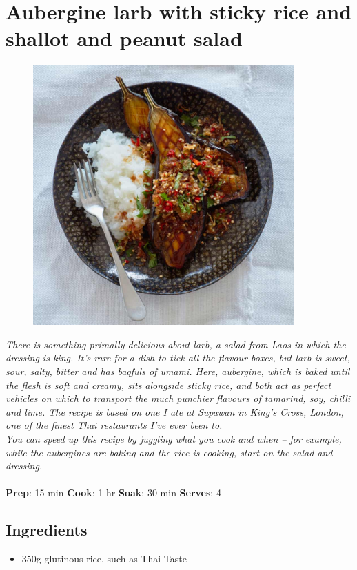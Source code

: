 \documentclass{book}
\begin{document}
\section{Aubergine larb with sticky rice and shallot and peanut salad}
\begin{figure}
\centering\includegraphics[width=10cm,height=10cm,keepaspectratio]{Recipe_Pictures/Aubergine_larb_with_sticky_rice_and_shallot_and_peanut_salad.png}
\end{figure}
\emph{There is something primally delicious about larb, a salad from Laos in which the dressing is king. It’s rare for a dish to tick all the flavour boxes, but larb is sweet, sour, salty, bitter and has bagfuls of umami. Here, aubergine, which is baked until the flesh is soft and creamy, sits alongside sticky rice, and both act as perfect vehicles on which to transport the much punchier flavours of tamarind, soy, chilli and lime. The recipe is based on one I ate at Supawan in King’s Cross, London, one of the finest Thai restaurants I’ve ever been to.\\ 
You can speed up this recipe by juggling what you cook and when – for example, while the aubergines are baking and the rice is cooking, start on the salad and dressing.}\\\\ 
\textbf{Prep}: 15 min
\textbf{Cook}: 1 hr
\textbf{Soak}: 30 min
\textbf{Serves}: 4
\subsection*{Ingredients}
\begin{itemize}
\item 350g glutinous rice, such as Thai Taste
\end{itemize}
\end{document}
